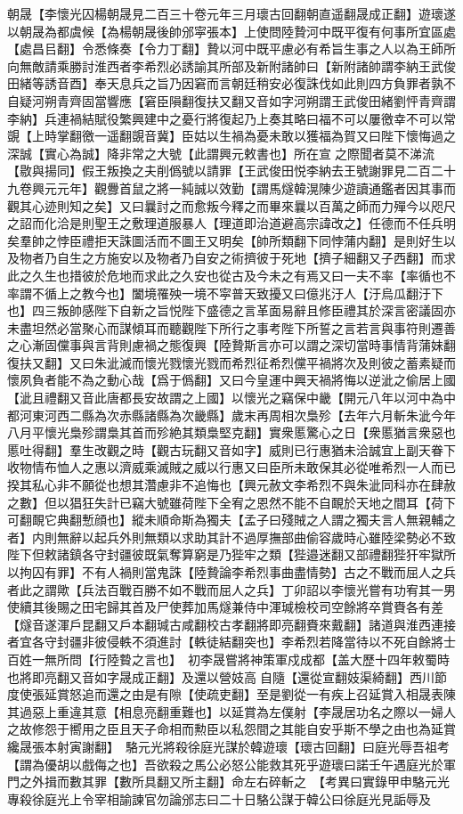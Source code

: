 朝晟【李懷光囚楊朝晟見二百三十卷元年三月瓌古回翻朝直遥翻晟成正翻】遊瓌遂以朝晟為都虞候【為楊朝晟後帥邠寜張本】上使問陸贄河中既平復有何事所宜區處【處昌㠯翻】令悉條奏【令力丁翻】贄以河中既平慮必有希旨生事之人以為王師所向無敵請乘勝討淮西者李希烈必誘諭其所部及新附諸帥曰【新附諸帥謂李納王武俊田緒等誘音酉】奉天息兵之旨乃因窘而言朝廷稍安必復誅伐如此則四方負罪者孰不自疑河朔青齊固當響應【窘臣隕翻復扶又翻又音如字河朔謂王武俊田緒劉怦青齊謂李納】兵連禍結賦役繁興建中之憂行將復起乃上奏其略曰福不可以屢徼幸不可以常覬【上時掌翻徼一遥翻覬音冀】臣姑以生禍為憂未敢以獲福為賀又曰陛下懷悔過之深誠【實心為誠】降非常之大號【此謂興元敕書也】所在宣之際聞者莫不涕流【敭與揚同】假王叛換之夫削僞號以請罪【王武俊田悦李納去王號謝罪見二百二十九卷興元元年】觀釁首鼠之將一純誠以效勤【謂馬燧韓滉陳少遊讀通鑑者因其事而觀其心迹則知之矣】又曰曩討之而愈叛今釋之而畢來曩以百萬之師而力殫今以咫尺之詔而化洽是則聖王之敷理道服暴人【理道即治道避高宗諱改之】任德而不任兵明矣羣帥之悖臣禮拒天誅圖活而不圖王又明矣【帥所類翻下同悖蒲内翻】是則好生以及物者乃自生之方施安以及物者乃自安之術擠彼于死地【擠子細翻又子西翻】而求此之久生也措彼於危地而求此之久安也從古及今未之有焉又曰一夫不率【率循也不率謂不循上之教今也】闔境罹殃一境不寜普天致擾又曰億兆汙人【汙烏瓜翻汙下也】四三叛帥感陛下自新之旨悦陛下盛德之言革面易辭且修臣禮其於深言密議固亦未盡坦然必當聚心而謀傾耳而聽觀陛下所行之事考陛下所誓之言若言與事符則遷善之心漸固儻事與言背則慮禍之態復興【陸贄斯言亦可以謂之深切當時事情背蒲妹翻復扶又翻】又曰朱泚滅而懷光戮懷光戮而希烈征希烈儻平禍將次及則彼之蓄素疑而懷夙負者能不為之動心哉【爲于僞翻】又曰今皇運中興天禍將悔以逆泚之偷居上國【泚且禮翻又音此唐都長安故謂之上國】以懷光之竊保中畿【開元八年以河中為中都河東河西二縣為次赤縣諸縣為次畿縣】歲末再周相次梟殄【去年六月斬朱泚今年八月平懷光梟殄謂梟其首而殄絶其類梟堅克翻】實衆慝驚心之日【衆慝猶言衆惡也慝吐得翻】羣生改觀之時【觀古玩翻又音如字】威則已行惠猶未洽誠宜上副天眷下收物情布恤人之惠以濟威乘滅賊之威以行惠又曰臣所未敢保其必從唯希烈一人而已揆其私心非不願從也想其濳慮非不追悔也【興元赦文李希烈不與朱泚同科亦在肆赦之數】但以猖狂失計已竊大號雖荷陛下全宥之恩然不能不自靦於天地之間耳【荷下可翻靦它典翻慙顔也】縱未順命斯為獨夫【孟子曰殘賊之人謂之獨夫言人無親輔之者】内則無辭以起兵外則無類以求助其計不過厚撫部曲偷容歲時心雖陸梁勢必不致陛下但敕諸鎮各守封疆彼既氣奪算窮是乃狴牢之類【狴邉迷翻又部禮翻狴犴牢獄所以拘囚有罪】不有人禍則當鬼誅【陸贄論李希烈事曲盡情勢】古之不戰而屈人之兵者此之謂歟【兵法百戰百勝不如不戰而屈人之兵】丁卯詔以李懷光嘗有功宥其一男使續其後賜之田宅歸其首及尸使葬加馬燧兼侍中渾瑊檢校司空餘將卒賞賚各有差【燧音遂渾戶昆翻又戶本翻瑊古咸翻校古孝翻將即亮翻賚來戴翻】諸道與淮西連接者宜各守封疆非彼侵軼不須進討【軼徒結翻突也】李希烈若降當待以不死自餘將士百姓一無所問【行陸䞇之言也】　初李晟嘗將神策軍戍成都【盖大歷十四年敕蜀時也將即亮翻又音如字晟成正翻】及還以營妓高自隨【還從宣翻妓渠綺翻】西川節度使張延賞怒追而還之由是有隙【使疏吏翻】至是劉從一有疾上召延賞入相晟表陳其過惡上重違其意【相息亮翻重難也】以延賞為左僕射【李晟居功名之際以一婦人之故修怨于嚮用之臣且天子命相而勲臣以私怨間之其能自安乎斯不學之由也為延賞纔晟張本射寅謝翻】　駱元光將殺徐庭光謀於韓遊瓌【瓌古回翻】曰庭光辱吾祖考【謂為優胡以戲侮之也】吾欲殺之馬公必怒公能救其死乎遊瓌曰諾壬午遇庭光於軍門之外揖而數其罪【數所具翻又所主翻】命左右碎斬之　【考異曰實錄甲申駱元光專殺徐庭光上令宰相諭諫官勿論邠志曰二十日駱公謀于韓公曰徐庭光見詬辱及